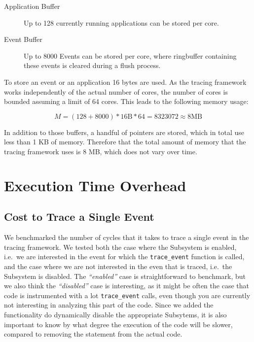 \documentclass[a4paper,11pt,twoside]{report}
\begin{document}
\begin{description}
	\item[Application Buffer] Up to 128 currently running applications can be
		stored per core.
	\item[Event Buffer] Up to 8000 Events can be stored per core, where
		ringbuffer containing these events is cleared during a flush process.
\end{description}

To store an event or an application 16 bytes are used. As the tracing framework
works independently of the actual number of cores, the number of cores is
bounded assuming a limit of 64 cores. This leads to the following memory usage:

\begin{equation}
	M = (128 + 8000) * 16 \textrm{B} * 64 = 8323072 \approx 8 \textrm{MB}
\end{equation}

In addition to those buffers, a handful of pointers are stored, which in total
use less than 1 KB of memory. Therefore that the total amount of memory that the
tracing framework uses is 8 MB, which does not vary over time.

\section{Execution Time Overhead}

\subsection{Cost to Trace a Single Event}

We benchmarked the number of cycles that it takes to trace a single event in the
tracing framework. We tested both the case where the Subsystem is enabled,
i.e.~we are interested in the event for which the \texttt{trace\_event} function
is called, and the case where we are not interested in the even that is traced,
i.e.~the Subsystem is disabled. The \emph{``enabled''} case is straightforward
to benchmark, but we also think the \emph{``disabled''} case is interesting, as
it might be often the case that code is instrumented with a lot
\texttt{trace\_event} calls, even though you are currently not interesting in
analyzing this part of the code. Since we added the functionality do dynamically
disable the appropriate Subsytems, it is also important to know by what degree
the execution of the code will be slower, compared to removing the statement
from the actual code.
\end{document}
